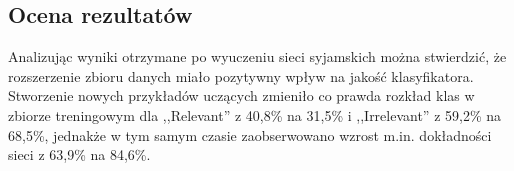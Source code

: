 \subsection{Ocena rezultatów}
Analizując wyniki otrzymane po wyuczeniu sieci syjamskich można stwierdzić, że rozszerzenie zbioru danych miało pozytywny wpływ na jakość klasyfikatora. Stworzenie nowych przykładów uczących zmieniło co prawda rozkład klas w zbiorze treningowym dla ,,Relevant'' z 40,8\% na 31,5\% i ,,Irrelevant'' z 59,2\% na 68,5\%, jednakże w tym samym czasie zaobserwowano wzrost m.in. dokładności sieci z 63,9\% na 84,6\%. 
